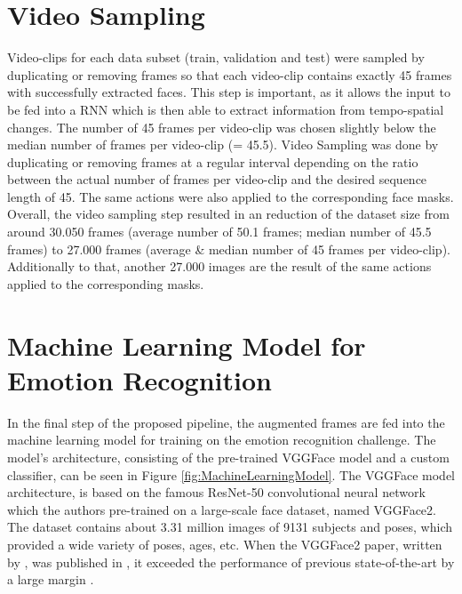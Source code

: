 \section{Video Sampling}
Video-clips for each data subset (train, validation and test) were sampled by duplicating or removing frames so that each video-clip contains exactly 45 frames with successfully extracted faces. This step is important, as it allows the input to be fed into a RNN which is then able to extract information from tempo-spatial changes.
\newline\newline
The number of 45 frames per video-clip was chosen slightly below the median number of frames per video-clip (= 45.5). Video Sampling was done by duplicating or removing frames at a regular interval depending on the ratio between the actual number of frames per video-clip and the desired sequence length of 45. The same actions were also applied to the corresponding face masks.
\newline\newline
Overall, the video sampling step resulted in an reduction of the dataset size from around 30.050 frames (average number of 50.1 frames; median number of 45.5 frames) to 27.000 frames (average \& median number of 45 frames per video-clip). Additionally to that, another 27.000 images are the result of the same actions applied to the corresponding masks.


\section{Machine Learning Model for Emotion Recognition}
In the final step of the proposed pipeline, the augmented frames are fed into the machine learning model for training on the emotion recognition challenge. The model's architecture, consisting of the pre-trained VGGFace model \citep{Cao:2018:VGGFace2} and a custom classifier, can be seen in Figure \ref{fig:MachineLearningModel}.
\newline\newline
The VGGFace model architecture, is based on the famous ResNet-50 convolutional neural network which the authors \citet{Cao:2018:VGGFace2} pre-trained on a large-scale face dataset, named VGGFace2. The dataset contains about 3.31 million images of 9131 subjects and poses, which provided a wide variety of poses, ages, etc. When the VGGFace2 paper, written by \citet{Cao:2018:VGGFace2}, was published in \citeyear{Cao:2018:VGGFace2}, it exceeded the performance of previous state-of-the-art by a large margin \citep{Cao:2018:VGGFace2}.\newline

